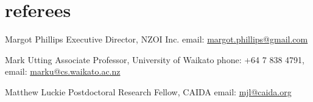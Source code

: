 \documentclass[]{boris-cv}
\begin{document}
\section{referees}

  {Margot Phillips}
  {Executive Director, NZOI Inc.}
  {email: \href{mailto:margot.phillips@gmail.com}{margot.phillips@gmail.com}}

  {Mark Utting}
  {Associate Professor, University of Waikato}
  {phone: +64 7 838 4791,
  email: \href{mailto:marku@cs.waikato.ac.nz}{marku@cs.waikato.ac.nz}}

  {Matthew Luckie}
  {Postdoctoral Research Fellow, CAIDA}
  {email: \href{mailto:mjl@caida.org}{mjl@caida.org}}
\end{document}
